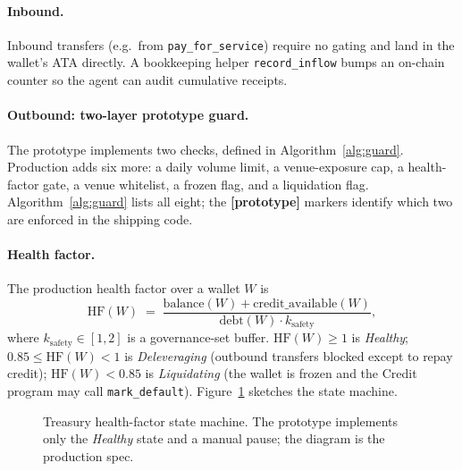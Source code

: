 \documentclass[10pt,conference,letterpaper]{IEEEtran}
\theoremstyle{definition}
\begin{document}
\paragraph{Inbound.} Inbound transfers (e.g.\ from
\texttt{pay\_for\_service}) require no gating and land in the wallet's
ATA directly. A bookkeeping helper \texttt{record\_inflow} bumps an
on-chain counter so the agent can audit cumulative receipts.

\paragraph{Outbound: two-layer prototype guard.}
The prototype implements two checks, defined in Algorithm~\ref{alg:guard}.
Production adds six more: a daily volume limit, a venue-exposure cap,
a health-factor gate, a venue whitelist, a frozen flag, and a
liquidation flag. Algorithm~\ref{alg:guard} lists all eight; the
\textbf{[prototype]} markers identify which two are enforced in the
shipping code.

\paragraph{Health factor.}
The production health factor over a wallet $W$ is
\begin{equation}
\mathrm{HF}(W) \;=\; \frac{\mathrm{balance}(W) + \mathrm{credit\_available}(W)}
                        {\mathrm{debt}(W) \cdot k_\mathrm{safety}},
\label{eq:hf}
\end{equation}
where $k_\mathrm{safety} \in [1,2]$ is a governance-set buffer.
$\mathrm{HF}(W) \ge 1$ is \emph{Healthy}; $0.85 \le \mathrm{HF}(W) <
1$ is \emph{Deleveraging} (outbound transfers blocked except to repay
credit); $\mathrm{HF}(W) < 0.85$ is \emph{Liquidating} (the wallet is
frozen and the Credit program may call \texttt{mark\_default}).
Figure~\ref{fig:hf} sketches the state machine.

\begin{figure}[t!]
\centering
{}
\caption{Treasury health-factor state machine. The prototype implements
only the \emph{Healthy} state and a manual pause; the diagram is the
production spec.}
\label{fig:hf}
\end{figure}
\end{document}
